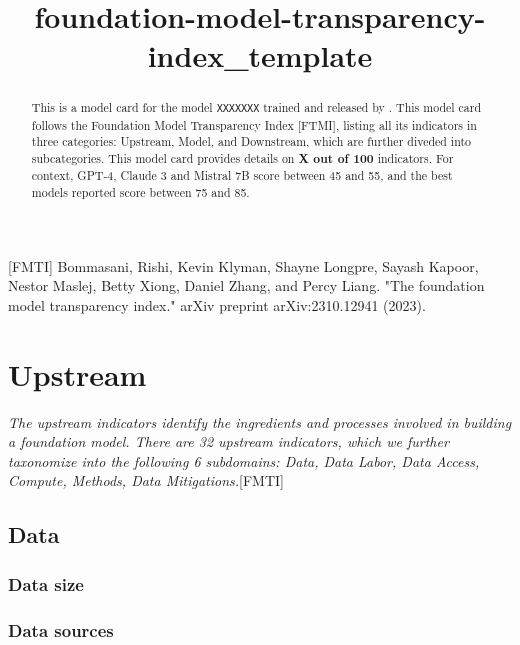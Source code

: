 \documentclass{article}
\title{foundation-model-transparency-index\_template}
\author{}
\date{}
\begin{document}
\maketitle

\begin{abstract}
	This is a model card for the model \texttt{XXXXXXX} trained and released by \texttt{}. This model card follows the Foundation Model Transparency Index [FTMI], listing all its indicators in three categories: Upstream, Model, and Downstream, which are further diveded into subcategories. This model card provides details on \textbf{X out of 100} indicators. For context, GPT-4, Claude 3 and Mistral 7B score between 45 and 55, and the best models reported score between 75 and 85.
    
\end{abstract}

[FMTI] Bommasani, Rishi, Kevin Klyman, Shayne Longpre, Sayash Kapoor, Nestor Maslej, Betty Xiong, Daniel Zhang, and Percy Liang. "The foundation model transparency index." arXiv preprint arXiv:2310.12941 (2023).

\tableofcontents

\section{Upstream}

\textit{The upstream indicators identify the ingredients and processes involved in building a foundation model. There are 32 upstream indicators, which we further taxonomize into the following 6 subdomains: Data, Data Labor, Data Access, Compute, Methods, Data Mitigations.}[FMTI]

\subsection{Data}

\subsubsection{Data size}



\subsubsection{Data sources}
\end{document}

